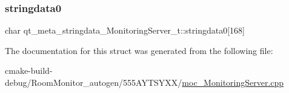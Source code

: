 \subsubsection{\texorpdfstring{stringdata0}{stringdata0}}
{\footnotesize\ttfamily char qt\+\_\+meta\+\_\+stringdata\+\_\+\+Monitoring\+Server\+\_\+t\+::stringdata0\mbox{[}168\mbox{]}}



The documentation for this struct was generated from the following file\+:\begin{DoxyCompactItemize}
\item 
cmake-\/build-\/debug/\+Room\+Monitor\+\_\+autogen/555\+A\+Y\+T\+S\+Y\+X\+X/\hyperlink{moc___monitoring_server_8cpp}{moc\+\_\+\+Monitoring\+Server.\+cpp}\end{DoxyCompactItemize}
